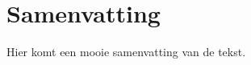 \documentclass[main]{subfiles}
\begin{document}
\chapter*{Samenvatting}\label{ch:samenvatting}

\begin{dutch}
    Hier komt een mooie samenvatting van de tekst.
\end{dutch}

\end{document}

